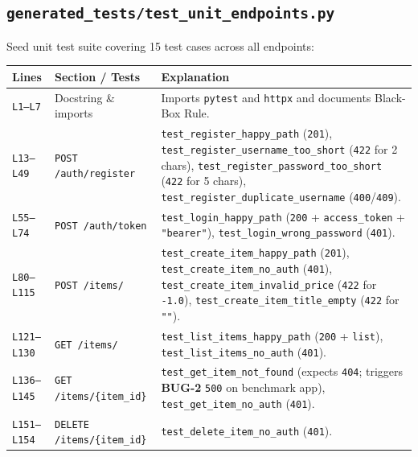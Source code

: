 \documentclass[11pt,a4paper]{article}
\begin{document}
\subsection{\texttt{generated\_tests/test\_unit\_endpoints.py}}
Seed unit test suite covering 15 test cases across all endpoints:
\begin{longtable}{L{1.4cm} L{5.2cm} L{9.0cm}}
\toprule
\textbf{Lines} & \textbf{Section / Tests} & \textbf{Explanation} \\
\midrule
\endhead
\texttt{L1--L7} & Docstring \& imports & Imports \texttt{pytest} and \texttt{httpx} and documents Black-Box Rule. \\
\texttt{L13--L49} & \texttt{POST /auth/register} & \texttt{test\_register\_happy\_path} (\texttt{201}), \texttt{test\_register\_username\_too\_short} (\texttt{422} for 2 chars), \texttt{test\_register\_password\_too\_short} (\texttt{422} for 5 chars), \texttt{test\_register\_duplicate\_username} (\texttt{400}/\texttt{409}). \\
\texttt{L55--L74} & \texttt{POST /auth/token} & \texttt{test\_login\_happy\_path} (\texttt{200} + \texttt{access\_token} + \texttt{"bearer"}), \texttt{test\_login\_wrong\_password} (\texttt{401}). \\
\texttt{L80--L115} & \texttt{POST /items/} & \texttt{test\_create\_item\_happy\_path} (\texttt{201}), \texttt{test\_create\_item\_no\_auth} (\texttt{401}), \texttt{test\_create\_item\_invalid\_price} (\texttt{422} for \texttt{-1.0}), \texttt{test\_create\_item\_title\_empty} (\texttt{422} for \texttt{""}). \\
\texttt{L121--L130} & \texttt{GET /items/} & \texttt{test\_list\_items\_happy\_path} (\texttt{200} + \texttt{list}), \texttt{test\_list\_items\_no\_auth} (\texttt{401}). \\
\texttt{L136--L145} & \texttt{GET /items/\{item\_id\}} & \texttt{test\_get\_item\_not\_found} (expects \texttt{404}; triggers \textbf{BUG-2} \texttt{500} on benchmark app), \texttt{test\_get\_item\_no\_auth} (\texttt{401}). \\
\texttt{L151--L154} & \texttt{DELETE /items/\{item\_id\}} & \texttt{test\_delete\_item\_no\_auth} (\texttt{401}). \\
\bottomrule
\end{longtable}

\end{document}
